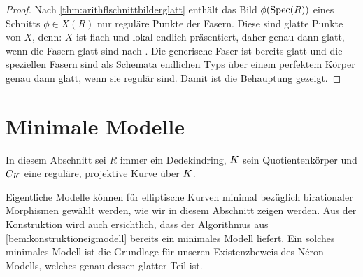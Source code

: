 \begin{Korollar}
\begin{proof}
    Nach \ref{thm:arithflschnittbilderglatt} enthält das Bild
    $\phi(\operatorname{Spec}(R))$ eines Schnitts $\phi\in X(R)$ nur reguläre
    Punkte der Fasern. Diese sind glatte Punkte von $X$, denn:
    $X$ ist flach und lokal endlich präsentiert, daher genau dann
    glatt, wenn die Fasern glatt sind nach
    \cite[8.5, Proposition 17]{bosch}.
    Die generische Faser ist bereits glatt und die speziellen Fasern
    sind als Schemata endlichen Typs über einem perfektem Körper
    genau dann glatt, wenn sie regulär sind.
    Damit ist die Behauptung gezeigt.
  \end{proof}
\end{Korollar}


\section{Minimale Modelle}\label{chap:minmodelle}
In diesem Abschnitt sei $R$ immer ein Dedekindring,
$K$ sein Quotientenkörper und $C_{K}$ eine
reguläre, projektive Kurve über $K$.

Eigentliche Modelle können für elliptische Kurven minimal
bezüglich birationaler Morphismen gewählt werden, wie wir in diesem
Abschnitt zeigen werden. Aus der Konstruktion wird auch ersichtlich,
dass der Algorithmus aus \ref{bem:konstruktioneigmodell} bereits ein
minimales Modell liefert.
Ein solches minimales Modell ist die Grundlage für unseren
Existenzbeweis des Néron-Modells, welches genau dessen glatter Teil
ist.

